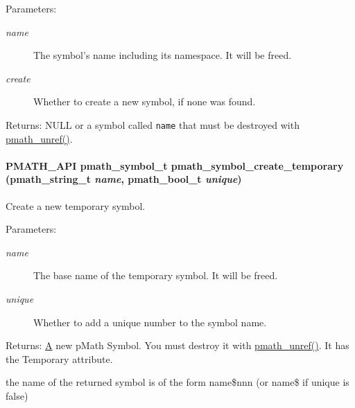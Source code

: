 \begin{Desc}
\item[Parameters:]
\begin{description}
\item[{\em name}]The symbol's name including its namespace. It will be freed. \item[{\em create}]Whether to create a new symbol, if none was found. \end{description}
\end{Desc}
\begin{Desc}
\item[Returns:]NULL or a symbol called {\tt name} that must be destroyed with \hyperlink{classpmath__t_54e905402c38940687033b87eb8c6c9f}{pmath\_\-unref()}. \end{Desc}
\hypertarget{group__symbols_g6f088bc8c667dfe91087dc4ace6d18c1}{
\paragraph[{pmath\_\-symbol\_\-create\_\-temporary}]{\setlength{\rightskip}{0pt plus 5cm}PMATH\_\-API {\bf pmath\_\-symbol\_\-t} pmath\_\-symbol\_\-create\_\-temporary ({\bf pmath\_\-string\_\-t} {\em name}, \/  {\bf pmath\_\-bool\_\-t} {\em unique})}\hfill}
\label{group__symbols_g6f088bc8c667dfe91087dc4ace6d18c1}


Create a new temporary symbol. 

\begin{Desc}
\item[Parameters:]
\begin{description}
\item[{\em name}]The base name of the temporary symbol. It will be freed. \item[{\em unique}]Whether to add a unique number to the symbol name. \end{description}
\end{Desc}
\begin{Desc}
\item[Returns:]\hyperlink{class_a}{A} new pMath Symbol. You must destroy it with \hyperlink{classpmath__t_54e905402c38940687033b87eb8c6c9f}{pmath\_\-unref()}. It has the Temporary attribute.\end{Desc}
the name of the returned symbol is of the form name\$nnn (or name\$ if unique is false)

